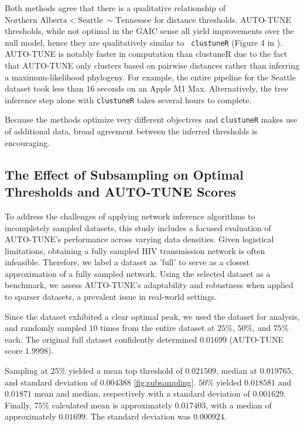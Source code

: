 \documentclass[utf8]{FrontiersinHarvard} %
\begin{document}
Both methods agree that there is a qualitative relationship of $\text{Northern
		Alberta} < \text{Seattle} ~\sim \text{Tennessee}$ for distance thresholds.
AUTO-TUNE thresholds, while not optimal in the GAIC sense all yield
improvements over the null model, hence they are qualitatively similar to {\tt
		clustuneR} (Figure 4 in \cite{chato_public_2020}). AUTO-TUNE is notably faster
in computation than clustuneR due to the fact that AUTO-TUNE only clusters
based on pairwise distances rather than inferring a maximum-likelihood
phylogeny. For example, the entire pipeline for the Seattle dataset took less
than $16$ seconds on an Apple M1 Max. Alternatively, the tree inference step
alone with {\tt clustuneR} takes several hours to complete.

Because the methods optimize very different objectives and {\tt clustuneR}
makes use of additional data, broad agreement between the inferred thresholds
is encouraging.

\subsection{The Effect of Subsampling on Optimal Thresholds and AUTO-TUNE Scores}

To address the challenges of applying network inference algorithms to
incompletely sampled datasets, this study includes a focused evaluation of
AUTO-TUNE's performance across varying data densities. Given logistical
limitations, obtaining a fully sampled HIV transmission network is often
infeasible. Therefore, we label a dataset as 'full' to serve as a closest
approximation of a fully sampled network. Using the selected dataset as a
benchmark, we assess AUTO-TUNE's adaptability and robustness when applied to
sparser datasets, a prevalent issue in real-world settings.

Since the \citep{rhee_national_2019} dataset exhibited a clear optimal peak, we
used the dataset for analysis, and randomly sampled $10$ times from the entire
dataset at $25\%$, $50\%$, and $75\%$ each. The original full dataset
confidently determined $0.01699$ (AUTO-TUNE score $1.9998$).

Sampling at $25\%$ yielded a mean top threshold of $0.021509$, median at
$0.019765$, and standard deviation of $0.004388$ \ref{fig:subsampling}.
$50\%$ yielded $0.018581$ and $0.01871$ mean and median, respectively with a
standard deviation of $0.001629$. Finally, $75\%$ calculated mean is
approximately $0.017403$, with a median of approximately $0.01699$. The
standard deviation was $0.000924$.
\end{document}
